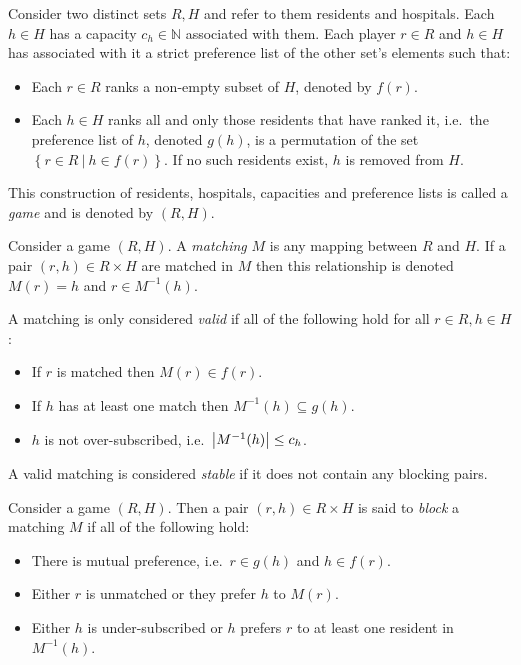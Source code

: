 \begin{definition}\label{def:game}
    Consider two distinct sets \(R, H\) and refer to them residents and
    hospitals. Each \(h \in H\) has a capacity \(c_h \in \mathbb{N}\) associated
    with them. Each player \(r \in R\) and \(h \in H\) has associated
    with it a strict preference list of the other set's elements such that:
    \begin{itemize}
        \item Each \(r \in R\) ranks a non-empty subset of \(H\), denoted by
            \(f(r)\).
        \item Each \(h \in H\) ranks all and only those residents that have
            ranked it, i.e.\ the preference list of \(h\), denoted \(g(h)\), is
            a permutation of the set
            \(\left\{r \in R \ | \ h \in f(r)\right\}\). If no such residents
            exist, \(h\) is removed from \(H\).
    \end{itemize}

    This construction of residents, hospitals, capacities and preference lists
    is called a \emph{game} and is denoted by \((R, H)\).
\end{definition}

\begin{definition}\label{def:matching}
    Consider a game \((R, H)\). A \emph{matching} \(M\) is any mapping between
    \(R\) and \(H\). If a pair \((r, h) \in R \times H\) are matched in \(M\)
    then this relationship is denoted \(M(r) = h\) and \(r \in M^{-1}(h)\).

    A matching is only considered \emph{valid} if all of the following hold for
    all \(r \in R, h \in H\):
    \begin{itemize}
        \item If \(r\) is matched then \(M(r) \in f(r)\).
        \item If \(h\) has at least one match then \(M^{-1}(h) \subseteq g(h)\).
        \item \(h\) is not over-subscribed, i.e.\ \(\abs*{M^{-1}(h)} \leq c_h\).
    \end{itemize}

    A valid matching is considered \emph{stable} if it does not contain any
    blocking pairs.
\end{definition}

\begin{definition}\label{def:blocking}
    Consider a game \((R, H)\). Then a pair \((r, h) \in R \times H\) is said to
    \emph{block} a matching \(M\) if all of the following hold:
    \begin{itemize}
        \item There is mutual preference, i.e.\ \(r \in g(h)\) and \(h \in
            f(r)\).
        \item Either \(r\) is unmatched or they prefer \(h\) to \(M(r)\).
        \item Either \(h\) is under-subscribed or \(h\) prefers \(r\) to at
            least one resident in \(M^{-1}(h)\).
    \end{itemize}
\end{definition}

